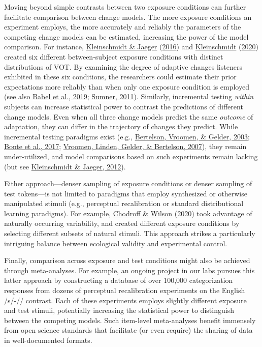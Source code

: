 \documentclass[
  11pt,
  english,
  man,floatsintext]{apa6}
\begin{document}
Moving beyond simple contrasts between two exposure conditions can further facilitate comparison between change models. The more exposure conditions an experiment employs, the more accurately and reliably the parameters of the competing change models can be estimated, increasing the power of the model comparison. For instance, \protect\hyperlink{ref-kleinschmidt-jaeger2016cogsci}{Kleinschmidt \& Jaeger} (\protect\hyperlink{ref-kleinschmidt-jaeger2016cogsci}{2016}) and \protect\hyperlink{ref-kleinschmidt2020}{Kleinschmidt} (\protect\hyperlink{ref-kleinschmidt2020}{2020}) created six different between-subject exposure conditions with distinct distributions of VOT. By examining the degree of adaptive changes listeners exhibited in these six conditions, the researchers could estimate their prior expectations more reliably than when only one exposure condition is employed (see also \protect\hyperlink{ref-babel2019}{Babel et al., 2019}; \protect\hyperlink{ref-sumner2011}{Sumner, 2011}). Similarly, incremental testing \emph{within} subjects can increase statistical power to contrast the predictions of different change models. Even when all three change models predict the same \emph{outcome} of adaptation, they can differ in the trajectory of changes they predict. While incremental testing paradigms exist (e.g., \protect\hyperlink{ref-bertelson2003}{Bertelson, Vroomen, \& Gelder, 2003}; \protect\hyperlink{ref-bonte2017}{Bonte et al., 2017}; \protect\hyperlink{ref-vroomen2007}{Vroomen, Linden, Gelder, \& Bertelson, 2007}), they remain under-utilized, and model comparisons based on such experiments remain lacking (but see \protect\hyperlink{ref-kleinschmidt-jaeger2012}{Kleinschmidt \& Jaeger, 2012}).

Either approach---denser sampling of exposure conditions or denser sampling of test tokens---is not limited to paradigms that employ synthesized or otherwise manipulated stimuli (e.g., perceptual recalibration or standard distributional learning paradigms). For example, \protect\hyperlink{ref-chodroff-wilson2020}{Chodroff \& Wilson} (\protect\hyperlink{ref-chodroff-wilson2020}{2020}) took advantage of naturally occurring variability, and created different exposure conditions by selecting different subsets of natural stimuli. This approach strikes a particularly intriguing balance between ecological validity and experimental control.

Finally, comparison across exposure and test conditions might also be achieved through meta-analyses. For example, an ongoing project in our labs pursues this latter approach by constructing a database of over 100,000 categorization responses from dozens of perceptual recalibration experiments on the English /s/-// contrast. Each of these experiments employs slightly different exposure and test stimuli, potentially increasing the statistical power to distinguish between the competing models. Such item-level meta-analyses benefit immensely from open science standards that facilitate (or even require) the sharing of data in well-documented formats.
\end{document}
